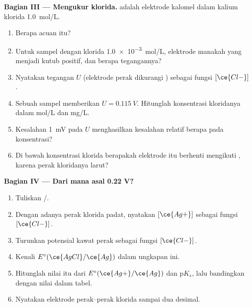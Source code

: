 \begin{problem}
\medskip
\noindent\textbf{Bagian III --- Mengukur klorida.}
 adalah elektrode kalomel dalam kalium klorida
\qty{1.0}{mol/L}.
\begin{enumerate}[resume]
  \item Berapa  acuan itu?
  \item Untuk sampel dengan klorida \qty{1.0e-3}{mol/L}, elektrode
        manakah yang menjadi kutub positif, dan berapa tegangannya?
  \item Nyatakan tegangan $U$ (elektrode perak dikurangi )
        sebagai fungsi $[\ce{Cl-}]$.
  \item Sebuah sampel memberikan $U = \qty{0.115}{V}$. Hitunglah
        konsentrasi kloridanya dalam \unit{mol/L} dan \unit{mg/L}.
  \item Kesalahan \qty{1}{mV} pada $U$ menghasilkan kesalahan relatif
        berapa pada konsentrasi?
  \item Di bawah konsentrasi klorida berapakah elektrode itu berhenti
        mengikuti , karena perak kloridanya larut?
\end{enumerate}

\medskip
\noindent\textbf{Bagian IV --- Dari mana asal 0.22 V?}
\begin{enumerate}[resume]
  \item Tuliskan  /.
  \item Dengan adanya perak klorida padat, nyatakan $[\ce{Ag+}]$ sebagai
        fungsi $[\ce{Cl-}]$.
  \item Turunkan potensial kawat perak sebagai fungsi $[\ce{Cl-}]$.
  \item Kenali $E^\circ(\ce{AgCl}/\ce{Ag})$ dalam ungkapan ini.
  \item Hitunglah nilai itu dari $E^\circ(\ce{Ag+}/\ce{Ag})$ dan
        $\mathrm{p}K_s$, lalu bandingkan dengan nilai dalam tabel.
  \item Nyatakan  elektrode perak--perak klorida sampai
        dua desimal.
\end{enumerate}
\end{problem}
